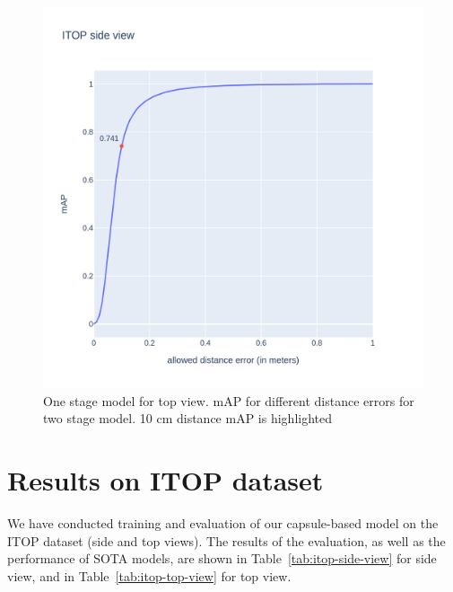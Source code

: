 \begin{figure}[htbp]
    \centerline{\includegraphics[trim=50 100 50 100,clip,scale=0.15]{Figures/one-stage-map-top-view.png}}
    \caption{One stage model for top view. mAP for different distance errors for two stage model. 10 cm distance mAP is highlighted}
    \label{img:one-stage-map-side-view}
\end{figure}

\section{Results on ITOP dataset}
\label{s:results-on-itop}

We have conducted training and evaluation of our capsule-based model on the ITOP dataset (side and top views). The results of the evaluation, as well as the performance of SOTA models, are shown in Table~\ref{tab:itop-side-view} for side view, and in Table~\ref{tab:itop-top-view} for top view.

